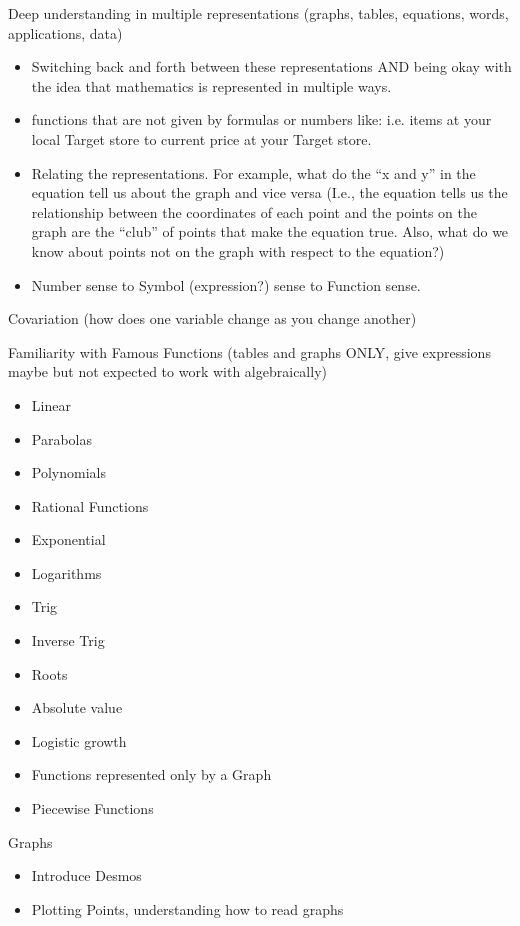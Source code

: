 \documentclass{ximera}
\begin{document}
\begin{objectives}
\item Deep understanding in multiple representations (graphs, tables, equations, words, applications, data)  
	\begin{itemize}
	\item Switching back and forth between these representations AND being okay with the idea that mathematics is represented in multiple ways. 
	\item functions that are not given by formulas or numbers like: i.e. items at your local Target store to current price at your Target store.  
	\item Relating the representations.  For example, what do the “x and y” in the equation tell us about the graph and vice versa (I.e., the equation tells us the relationship between the coordinates of each point and the points on the graph are the “club” of points that make the equation true.  Also, what do we know about points not on the graph with respect to the equation?) 
	\item Number sense to Symbol (expression?) sense to Function sense. 
	\end{itemize}
\item Covariation (how does one variable change as you change another) 
\item Familiarity with Famous Functions (tables and graphs ONLY, give expressions maybe but not expected to work with algebraically) 
	\begin{itemize}
	\item Linear 
	\item Parabolas 
	\item Polynomials 
	\item Rational Functions 
	\item Exponential 
	\item Logarithms 
	\item Trig 
	\item Inverse Trig 
	\item Roots 
	\item Absolute value 
	\item Logistic growth 
	\item Functions represented only by a Graph 
	\item Piecewise Functions
	\end{itemize}
\item Graphs
	\begin{itemize}
	\item Introduce Desmos
	\item Plotting Points, understanding how to read graphs 

\end{itemize}
\end{objectives}
\end{document}
